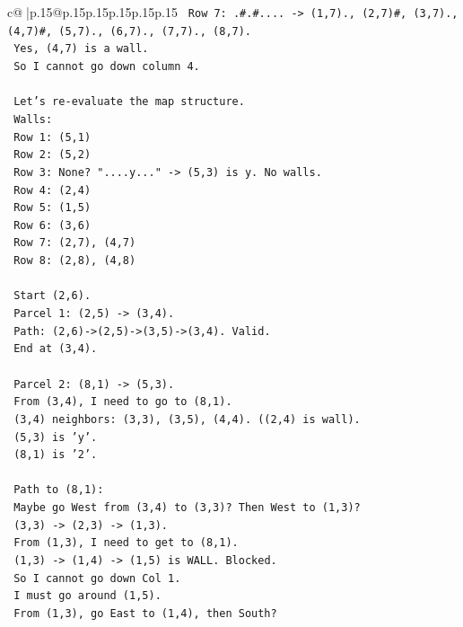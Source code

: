 \documentclass{article}
\begin{document}
{\begin{supertabular}{c@{$\;$}|p{.15\linewidth}@{}p{.15\linewidth}p{.15\linewidth}p{.15\linewidth}p{.15\linewidth}p{.15\linewidth}}
{{{\texttt{   Row 7: .\#.\#.... {-}> (1,7)., (2,7)\#, (3,7)., (4,7)\#, (5,7)., (6,7)., (7,7)., (8,7).} \\
\texttt{   Yes, (4,7) is a wall.} \\
\texttt{   So I cannot go down column 4.} \\
\\ 
\texttt{   Let's re{-}evaluate the map structure.} \\
\texttt{   Walls:} \\
\texttt{   Row 1: (5,1)} \\
\texttt{   Row 2: (5,2)} \\
\texttt{   Row 3: None? "....y..." {-}> (5,3) is y. No walls.} \\
\texttt{   Row 4: (2,4)} \\
\texttt{   Row 5: (1,5)} \\
\texttt{   Row 6: (3,6)} \\
\texttt{   Row 7: (2,7), (4,7)} \\
\texttt{   Row 8: (2,8), (4,8)} \\
\\ 
\texttt{   Start (2,6).} \\
\texttt{   Parcel 1: (2,5) {-}> (3,4).} \\
\texttt{   Path: (2,6){-}>(2,5){-}>(3,5){-}>(3,4). Valid.} \\
\texttt{   End at (3,4).} \\
\\ 
\texttt{   Parcel 2: (8,1) {-}> (5,3).} \\
\texttt{   From (3,4), I need to go to (8,1).} \\
\texttt{   (3,4) neighbors: (3,3), (3,5), (4,4). ((2,4) is wall).} \\
\texttt{   (5,3) is 'y'.} \\
\texttt{   (8,1) is '2'.} \\
\\ 
\texttt{   Path to (8,1):} \\
\texttt{   Maybe go West from (3,4) to (3,3)? Then West to (1,3)?} \\
\texttt{   (3,3) {-}> (2,3) {-}> (1,3).} \\
\texttt{   From (1,3), I need to get to (8,1).} \\
\texttt{   (1,3) {-}> (1,4) {-}> (1,5) is WALL. Blocked.} \\
\texttt{   So I cannot go down Col 1.} \\
\texttt{   I must go around (1,5).} \\
\texttt{   From (1,3), go East to (1,4), then South?} \\
}}}
\end{supertabular}}
\end{document}
